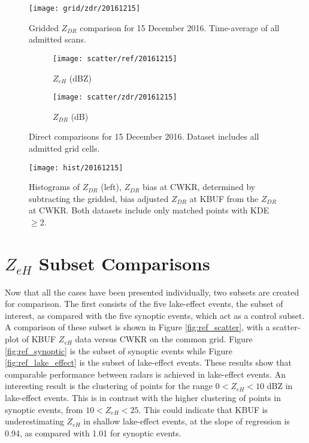 \begin{figure}[p]
\texttt{[image: grid/zdr/20161215]}
\caption{Gridded $Z_{DR}$ comparison for 15 December 2016. Time-average of all admitted scans.} 
\label{fig:grid_zdr_20161215}
\end{figure}

\begin{figure}[p]
\centering
   \begin{subfigure}{0.49\linewidth} \centering
     \texttt{[image: scatter/ref/20161215]}
     \caption{$Z_{eH}$ (dBZ)}\label{fig:scatter_ref_20161215}
   \end{subfigure}
   \begin{subfigure}{0.49\linewidth} \centering
     \texttt{[image: scatter/zdr/20161215]}
     \caption{$Z_{DR}$ (dB)}\label{fig:scatter_zdr_20161215}
   \end{subfigure}
\caption{Direct comparisons for 15 December 2016. Dataset includes all admitted grid cells.} \label{fig:scatter_20161215}
\end{figure}

\begin{figure}[p]
\texttt{[image: hist/20161215]}\centering
\caption{Histograms of $Z_{DR}$ (left), $Z_{DR}$ bias at CWKR, determined by subtracting the gridded, bias adjusted $Z_{DR}$ at KBUF from the $Z_{DR}$ at
CWKR. Both datasets include only matched points with KDE $\geq 2$. } 
\label{fig:hist_20161215}
\end{figure}

\section{$Z_{eH}$ Subset Comparisons}
Now that all the cases have been presented individually, two subsets are created for comparison. The first consists of the five lake-effect events, the
subset of interest, as compared with the five synoptic events, which act as a control subset.
A comparison of these subset is shown in Figure \ref{fig:ref_scatter}, with a scatter-plot of KBUF $Z_{eH}$ data versus CWKR on the common grid. Figure
\ref{fig:ref_synoptic} is the subset of synoptic events while Figure \ref{fig:ref_lake_effect} is the subset of lake-effect events. These results show that
comparable performance between radars is achieved in lake-effect events. An interesting result is the clustering of points for the range $0 < Z_{eH} < 10$ dBZ in lake-effect events. This is in contrast with the higher clustering of points in synoptic events, from $10 < Z_{eH} < 25$. This could indicate that KBUF is underestimating $Z_{eH}$ in shallow lake-effect events, at the slope of regression is 0.94, as compared with 1.01 for synoptic events.

